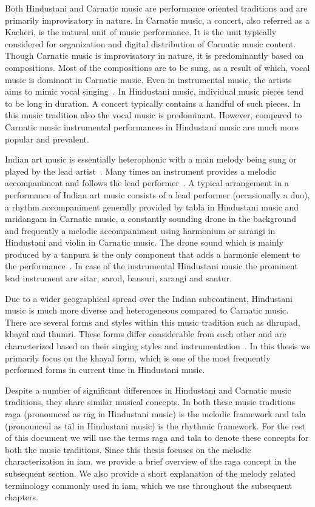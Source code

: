 Both Hindustani and Carnatic music are performance oriented traditions and are primarily improvisatory in nature. In Carnatic music, a concert, also referred as a Kach\={e}ri, is the natural unit of music performance. It is the unit typically considered for organization and digital distribution of Carnatic music content. Though Carnatic music is improvisatory in nature, it is predominantly based on compositions. Most of the compositions are to be sung, as a result of which, vocal music is dominant in Carnatic music. Even in instrumental music, the artists aims to mimic vocal singing~\citep{Viswanathan2004}. In Hindustani music, individual music pieces tend to be long in duration. A concert typically contains a handful of such pieces. In this music tradition also the vocal music is predominant. However, compared to Carnatic music instrumental performances in Hindustani music are much more popular and prevalent.

Indian art music is essentially heterophonic with a main melody being sung or played by the lead artist~\cite{Bagchee1998}. Many times an instrument provides a melodic accompaniment and follows the lead performer~\cite{Viswanathan2004}. A typical arrangement in a performance of Indian art music consists of a lead performer (occasionally a duo), a rhythm accompaniment generally provided by \gls{tabla} in Hindustani music and \gls{mridangam} in Carnatic music, a constantly sounding drone in the background and frequently a
melodic accompaniment using harmonium or \gls{sarangi} in Hindustani and violin in Carnatic music. The drone sound which is mainly produced by a \gls{tanpura} is the only component that adds a harmonic element to the performance~\cite{Bagchee1998}. In case of the instrumental Hindustani music the prominent lead instrument are \gls{sitar}, \gls{sarod}, \gls{bansuri}, \gls{sarangi} and \gls{santur}.

Due to a wider geographical spread over the Indian subcontinent, Hindustani music is much more diverse and heterogeneous compared to Carnatic music. There are several forms and styles within this music tradition such as \gls{dhrupad}, \gls{khayal} and \gls{thumri}. These forms differ considerable from each other and are characterized based on their singing styles and instrumentation~\cite{Bor2010}. In this thesis we primarily focus on the \gls{khayal} form, which is one of the most frequently performed forms in current time in Hindustani music. 


Despite a number of significant differences in Hindustani and Carnatic music traditions, they share similar musical concepts. In both these music traditions \gls{raga} (pronounced as r\={a}g in Hindustani music) is the melodic framework and \gls{tala} (pronounced as t\={a}l in Hindustani music) is the rhythmic framework. For the rest of this document we will use the terms \gls{raga} and \gls{tala} to denote these concepts for both the music traditions. Since this thesis focuses on the melodic characterization in \gls{iam}, we provide a brief overview of the \gls{raga} concept in the subsequent section. We also provide a short explanation of the melody related terminology commonly used in \gls{iam}, which we use throughout the subsequent chapters. 

